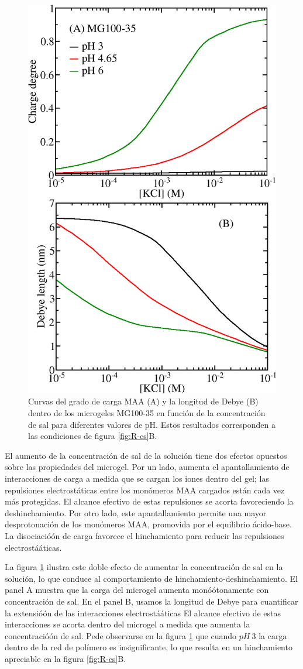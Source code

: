 \begin{figure}[!tb]
	\centering
	\includegraphics[width=0.5\linewidth]{Figures/graph-gel/f-cs.png}
	\caption{Curvas del grado de carga MAA (A) y la longitud de Debye (B) dentro de los microgeles MG100-35 en funci\'on de la concentraci\'on de sal para diferentes valores de pH.
		Estos resultados corresponden a las condiciones de figura \ref{fig:R-cs}B.}
	\label{fig:f-cs}
\end{figure}



El aumento de la concentraci\'on de sal de la soluci\'on tiene dos efectos opuestos sobre las propiedades del microgel.
Por un lado, aumenta el apantallamiento de interacciones de carga a medida que se cargan los iones dentro del gel; las repulsiones electrost\'aticas entre los mon\'omeros MAA cargados est\'an cada vez m\'as protegidas.
El alcance efectivo de estas repulsiones se acorta favoreciendo la deshinchamiento.
Por otro lado, este apantallamiento permite una mayor desprotonaci\'on de los mon\'omeros MAA, promovida por el equilibrio \'acido-base.
La disociació\'on de carga favorece el hinchamiento para reducir las repulsiones electrostá\'aticas.


La figura \ref{fig:f-cs} ilustra este doble efecto de aumentar la concentraci\'on de sal en la soluci\'on, lo que conduce al comportamiento de hinchamiento-deshinchamiento.
El panel A muestra que la carga del microgel aumenta monó\'otonamente con concentraci\'on de sal.
En el panel B, usamos la longitud de Debye para cuantificar la extensió\'on de las interacciones electrostá\'aticas %
El alcance efectivo de estas interacciones se acorta dentro del microgel a medida que aumenta la concentració\'on de sal.
Pede observarse en la figura \ref{fig:f-cs} que cuando $pH~3$ la carga dentro de la red de polímero es insignificante, lo que resulta en un hinchamiento apreciable en la figura \ref{fig:R-cs}B.



